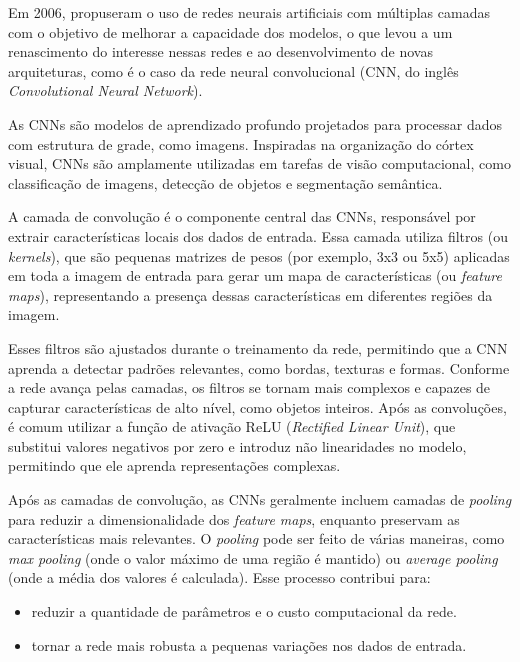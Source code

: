 Em 2006, \cite{Hinton2006} propuseram o uso de redes neurais artificiais com múltiplas camadas com o objetivo de melhorar a capacidade dos modelos, o que levou a um renascimento do interesse nessas redes e ao desenvolvimento de novas arquiteturas, como é o caso da rede neural convolucional (CNN, do inglês \textit{Convolutional Neural Network}).

As CNNs são modelos de aprendizado profundo projetados para processar dados com estrutura de grade, como imagens. Inspiradas na organização do córtex visual, CNNs são amplamente utilizadas em tarefas de visão computacional, como classificação de imagens, detecção de objetos e segmentação semântica.

A camada de convolução é o componente central das CNNs, responsável por extrair características locais dos dados de entrada. Essa camada utiliza filtros (ou \textit{kernels}), que são pequenas matrizes de pesos (por exemplo, 3x3 ou 5x5) aplicadas em toda a imagem de entrada para gerar um mapa de características (ou \textit{feature maps}), representando a presença dessas características em diferentes regiões da imagem.

Esses filtros são ajustados durante o treinamento da rede, permitindo que a CNN aprenda a detectar padrões relevantes, como bordas, texturas e formas. Conforme a rede avança pelas camadas, os filtros se tornam mais complexos e capazes de capturar características de alto nível, como objetos inteiros. Após as convoluções, é comum utilizar a função de ativação ReLU (\textit{Rectified Linear Unit}), que substitui valores negativos por zero e introduz não linearidades no modelo, permitindo que ele aprenda representações complexas.

Após as camadas de convolução, as CNNs geralmente incluem camadas de \textit{pooling} para reduzir a dimensionalidade dos \textit{feature maps}, enquanto preservam as características mais relevantes. O \textit{pooling} pode ser feito de várias maneiras, como \textit{max pooling} (onde o valor máximo de uma região é mantido) ou \textit{average pooling} (onde a média dos valores é calculada). Esse processo contribui para:

\begin{itemize}
    \item reduzir a quantidade de parâmetros e o custo computacional da rede.
    \item tornar a rede mais robusta a pequenas variações nos dados de entrada.
\end{itemize}

